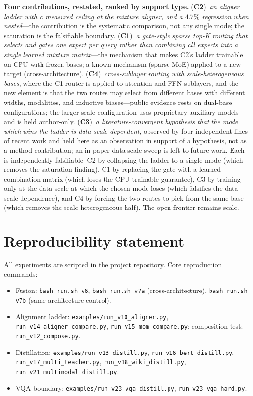 \documentclass[10pt,twoside]{article}
\theoremstyle{definition}
\begin{document}
\textbf{Four contributions, restated, ranked by support type.} (\textbf{C2})~\emph{an aligner ladder with a measured ceiling at the mixture aligner, and a $4.7\%$ regression when nested}---the contribution is the systematic comparison, not any single mode; the saturation is the falsifiable boundary. (\textbf{C1})~\emph{a gate-style sparse top-K routing that selects and gates one expert per query rather than combining all experts into a single learned mixture matrix}---the mechanism that makes C2's ladder trainable on CPU with frozen bases; a known mechanism (sparse MoE) applied to a new target (cross-architecture). (\textbf{C4})~\emph{cross-sublayer routing with scale-heterogeneous bases}, where the C1 router is applied to attention and FFN sublayers, and the new element is that the two routes may select from different bases with different widths, modalities, and inductive biases---public evidence rests on dual-base configurations; the larger-scale configuration uses proprietary auxiliary models and is held author-only. (\textbf{C3})~\emph{a literature-convergent hypothesis that the mode which wins the ladder is data-scale-dependent}, observed by four independent lines of recent work and held here as an observation in support of a hypothesis, not as a method contribution; an in-paper data-scale sweep is left to future work. Each is independently falsifiable: C2 by collapsing the ladder to a single mode (which removes the saturation finding), C1 by replacing the gate with a learned combination matrix (which loses the CPU-trainable guarantee), C3 by training only at the data scale at which the chosen mode loses (which falsifies the data-scale dependence), and C4 by forcing the two routes to pick from the same base (which removes the scale-heterogeneous half). The open frontier remains scale.

\section*{Reproducibility statement}
\label{sec:repro}

All experiments are scripted in the project repository. Core reproduction commands:

\begin{itemize}[leftmargin=1.6em, itemsep=0.5pt, parsep=0pt]
    \item Fusion: \texttt{bash run.sh v6}, \texttt{bash run.sh v7a} (cross-architecture), \texttt{bash run.sh v7b} (same-architecture control).
    \item Alignment ladder: \texttt{examples/run\_v10\_aligner.py}, \texttt{run\_v14\_aligner\_compare.py}, \texttt{run\_v15\_mom\_compare.py}; composition test: \texttt{run\_v12\_compose.py}.
    \item Distillation: \texttt{examples/run\_v13\_distill.py}, \texttt{run\_v16\_bert\_distill.py}, \texttt{run\_v17\_multi\_teacher.py}, \texttt{run\_v18\_wiki\_distill.py}, \texttt{run\_v21\_multimodal\_distill.py}.
    \item VQA boundary: \texttt{examples/run\_v23\_vqa\_distill.py}, \texttt{run\_v23\_vqa\_hard.py}.
\end{itemize}
\end{document}
